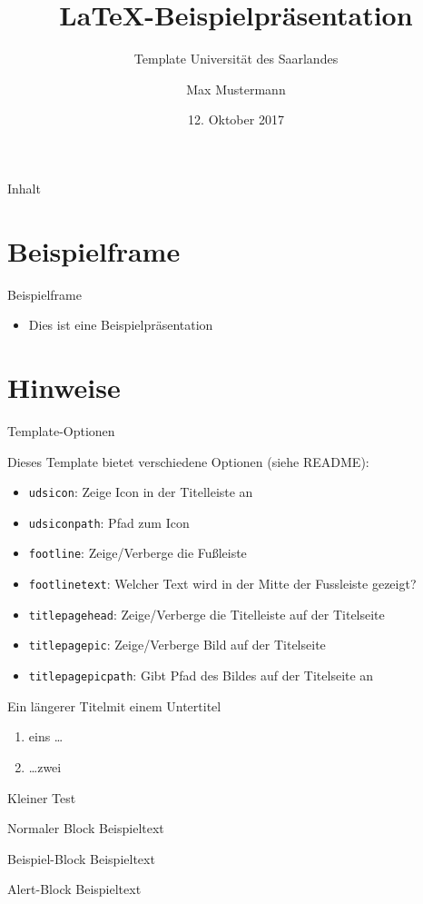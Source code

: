\documentclass{beamer}
\author[Mustermann]{Max Mustermann}
\title{\LaTeX-Beispielpräsentation}
\subtitle{Template Universität des Saarlandes}
\institute[UdS]{Universität des Saarlandes}
\date[12.10.2017]{12. Oktober 2017}
\begin{document}
\begin{frame}
  \titlepage
\end{frame}

\begin{frame}{Inhalt}
  \tableofcontents
\end{frame}

\section{Beispielframe}

\begin{frame}{Beispielframe}
  \begin{itemize}
    \item Dies ist eine Beispielpräsentation
  \end{itemize}
\end{frame}

\section{Hinweise}

\begin{frame}{Template-Optionen}

  Dieses Template bietet verschiedene Optionen (siehe README):
	
	\begin{itemize}
    \item \texttt{udsicon}: Zeige Icon in der Titelleiste an
    \item \texttt{udsiconpath}: Pfad zum Icon 
    \item \texttt{footline}: Zeige/Verberge die Fußleiste
    \item \texttt{footlinetext}: Welcher Text wird in der Mitte der Fussleiste
      gezeigt?
    \item \texttt{titlepagehead}: Zeige/Verberge die Titelleiste auf der
      Titelseite
    \item \texttt{titlepagepic}: Zeige/Verberge Bild auf der Titelseite
    \item \texttt{titlepagepicpath}: Gibt Pfad des Bildes auf der Titelseite an
	\end{itemize}
	
\end{frame}

\begin{frame}{Ein längerer Titel}{mit einem Untertitel}
  \begin{enumerate}
    \item eins \ldots 
    \item \ldots zwei
  \end{enumerate}
\end{frame}

\begin{frame}{Kleiner Test}

  \begin{block}{Normaler Block}
    Beispieltext
  \end{block}

  \begin{exampleblock}{Beispiel-Block}
    Beispieltext
  \end{exampleblock}

  \begin{alertblock}{Alert-Block}
    Beispieltext
  \end{alertblock}

\end{frame}
\end{document}

